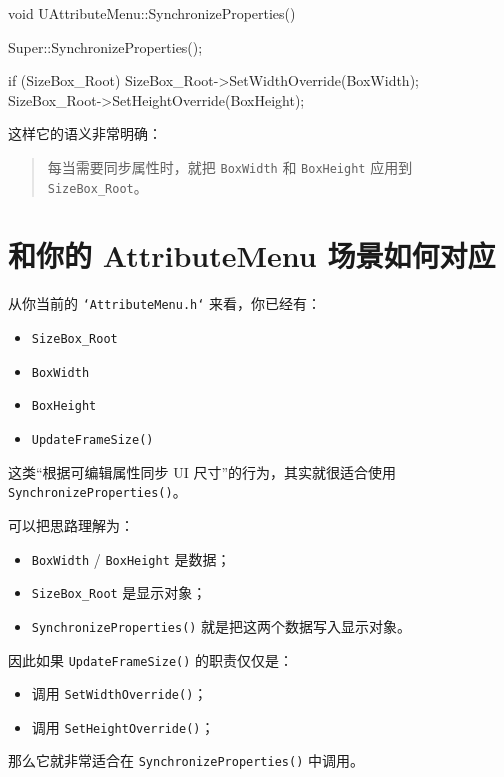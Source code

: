 \documentclass[10pt,CJKmath]{ctexart}
\begin{document}
\begin{code}
	void UAttributeMenu::SynchronizeProperties()
	{
		Super::SynchronizeProperties();
		
		if (SizeBox_Root)
		{
			SizeBox_Root->SetWidthOverride(BoxWidth);
			SizeBox_Root->SetHeightOverride(BoxHeight);
		}
	}
\end{code}

这样它的语义非常明确：

\begin{quote}
	每当需要同步属性时，就把 \texttt{BoxWidth} 和 \texttt{BoxHeight} 应用到 \texttt{SizeBox\_Root}。
\end{quote}

\section{和你的 AttributeMenu 场景如何对应}

从你当前的 \texttt{`AttributeMenu.h`} 来看，你已经有：

\begin{itemize}
	\item \texttt{SizeBox\_Root}
	\item \texttt{BoxWidth}
	\item \texttt{BoxHeight}
	\item \texttt{UpdateFrameSize()}
\end{itemize}

这类“根据可编辑属性同步 UI 尺寸”的行为，其实就很适合使用 \texttt{SynchronizeProperties()}。

可以把思路理解为：

\begin{itemize}
	\item \texttt{BoxWidth} / \texttt{BoxHeight} 是数据；
	\item \texttt{SizeBox\_Root} 是显示对象；
	\item \texttt{SynchronizeProperties()} 就是把这两个数据写入显示对象。
\end{itemize}

因此如果 \texttt{UpdateFrameSize()} 的职责仅仅是：

\begin{itemize}
	\item 调用 \texttt{SetWidthOverride()}；
	\item 调用 \texttt{SetHeightOverride()}；
\end{itemize}

那么它就非常适合在 \texttt{SynchronizeProperties()} 中调用。
\end{document}
